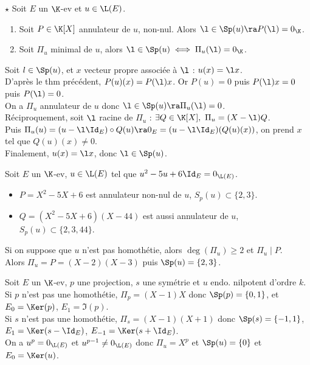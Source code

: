 \documentclass[11pt]{article}
\begin{document}
\begin{prop}{$\star$}{}
    Soit $E$ un $\K$-ev et $u\in\L(E)$.
    \begin{enumerate}
        \item Soit $P\in\K[X]$ annulateur de $u$, non-nul. Alors $\l\in\Sp(u)\ra P(\l)=0_\K$.
        \item Soit $\Pi_u$ minimal de $u$, alors $\l\in\Sp(u)\iff \Pi_u(\l)=0_\K$.
    \end{enumerate}
    \tcblower
     Soit $l\in\Sp(u)$, et $x$ vecteur propre associée à $\l$  : $u(x)=\l x$.\\
    D'après le thm précédent, $P(u)(x)=P(\l)x$. Or $P(u)=0$ puis $P(\l)x=0$ puis $P(\l)=0$.\\
     On a $\Pi_u$ annulateur de $u$ donc $\l\in\Sp(u)\ra \Pi_u(\l)=0$.\\
    Réciproquement, soit $\l$ racine de $\Pi_u$ : $\exists Q \in \K[X], ~ \Pi_u=(X-\l)Q$.\\
    Puis $\Pi_u(u)=(u-\l\Id_E)\circ Q(u) \ra 0_E = (u - \l \Id_E)(Q(u)(x))$, on prend $x$ tel que $Q(u)(x)\neq0$.\\
    Finalement, $u(x)=\l x$, donc $\l\in\Sp(u)$.
\end{prop}

\vspace*{-0.6cm}

\begin{ex}{}{}
    Soit $E$ un $\K$-ev, $u\in\L(E)$ tel que $u^2-5u+6\Id_E=0_{\L(E)}$.
    \begin{itemize}
        \item $P=X^2-5X+6$ est annulateur non-nul de $u$, $S_p(u)\subset\{2,3\}$.
        \item $Q=(X^2-5X+6)(X-44)$ est aussi annulateur de $u$, $S_p(u)\subset\{2,3,44\}$. 
    \end{itemize}
    Si on suppose que $u$ n'est pas homothétie, alors $\deg(\Pi_u)\geq2$ et $\Pi_u\mid P$.\\
    Alors $\Pi_u=P=(X-2)(X-3)$ puis $\Sp(u)=\{2,3\}$.
\end{ex}

\begin{ex}{}{}
    Soit $E$ un $\K$-ev, $p$ une projection, $s$ une symétrie et $u$ endo. nilpotent d'ordre $k$.\\
    Si $p$ n'est pas une homothétie, $\Pi_p=(X-1)X$ donc $\Sp(p)=\{0,1\}$, et $E_0=\Ker(p)$, $E_1=\Im(p)$. \\
    Si $s$ n'est pas une homothétie, $\Pi_s=(X-1)(X+1)$ donc $\Sp(s)=\{-1,1\}$, $E_1=\Ker(s-\Id_E)$, $E_{-1}=\Ker(s+\Id_E)$.\\
    On a $u^p=0_{\L(E)}$ et $u^{p-1}\neq0_{\L(E)}$ donc $\Pi_u=X^p$ et $\Sp(u)=\{0\}$ et $E_0=\Ker(u)$.
\end{ex}
\end{document}
